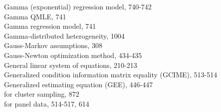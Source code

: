 \documentclass[10pt]{article}
\begin{document}
Gamma (exponential) regression model, 740-742\\
Gamma QMLE, 741\\
Gamma regression model, 741\\
Gamma-distributed heterogeneity, 1004\\
Gauss-Markov assumptions, 308\\
Gauss-Newton optimization method, 434-435\\
General linear system of equations, 210-213\\
Generalized condition information matrix equality (GCIME), 513-514\\
Generalized estimating equation (GEE), 446-447\\
for cluster sampling, 872\\
for panel data, 514-517, 614
\end{document}
